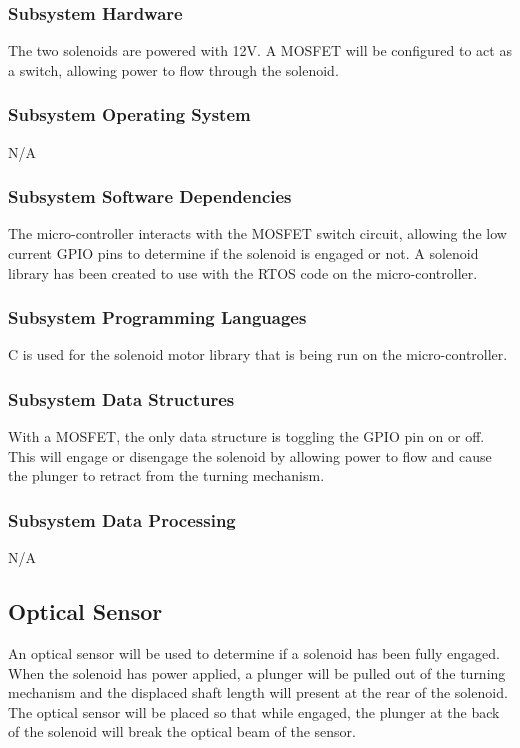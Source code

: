 \subsubsection{Subsystem Hardware}
The two solenoids are powered with 12V. A MOSFET will be configured to act as a switch, allowing power to flow through the solenoid.

\subsubsection{Subsystem Operating System}
N/A

\subsubsection{Subsystem Software Dependencies}
The micro-controller interacts with the MOSFET switch circuit, allowing the low current GPIO pins to determine if the solenoid is engaged or not. A solenoid library has been created to use with the RTOS code on the micro-controller.

\subsubsection{Subsystem Programming Languages}
C is used for the solenoid motor library that is being run on the micro-controller.

\subsubsection{Subsystem Data Structures}
With a MOSFET, the only data structure is toggling the GPIO pin on or off. This will engage or disengage the solenoid by allowing power to flow and cause the plunger to retract from the turning mechanism.

\subsubsection{Subsystem Data Processing}
N/A

\subsection{Optical Sensor}
An optical sensor will be used to determine if a solenoid has been fully engaged. When the solenoid has power applied, a plunger will be pulled out of the turning mechanism and the displaced shaft length will present at the rear of the solenoid. The optical sensor will be placed so that while engaged, the plunger at the back of the solenoid will break the optical beam of the sensor.

